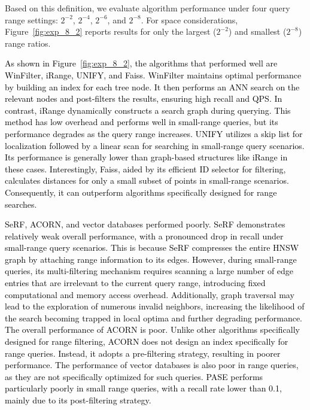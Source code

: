\documentclass[sigconf, nonacm, pdfa]{acmart}
\begin{document}
{	Based on this definition, we evaluate algorithm performance under four query range settings: $2^{-2}$, $2^{-4}$, $2^{-6}$, and $2^{-8}$. For space considerations, Figure~\ref{fig:exp_8_2} reports results for only the largest ($2^{-2}$) and smallest ($2^{-8}$) range ratios. 
	

	
	\textcolor{black}{
		As shown in Figure~\ref{fig:exp_8_2}, the algorithms that performed well are WinFilter, iRange, UNIFY, and Faiss.
	WinFilter maintains optimal performance by building an index for each tree node. It then performs an ANN search on the relevant nodes and post-filters the results, ensuring high recall and QPS.
	In contrast, iRange dynamically constructs a search graph during querying. This method has low overhead and performs well in small-range queries, but its performance degrades as the query range increases.
	UNIFY utilizes a skip list for localization followed by a linear scan for searching in small-range query scenarios. Its performance is generally lower than graph-based structures like iRange in these cases.
	Interestingly, Faiss, aided by its efficient ID selector for filtering, calculates distances for only a small subset of points in small-range scenarios. Consequently, it can outperform algorithms specifically designed for range searches.
	}

	\textcolor{black}{SeRF, ACORN, and vector databases performed poorly.
		SeRF demonstrates relatively weak overall performance, with a pronounced drop in recall under small-range query scenarios. This is because SeRF compresses the entire HNSW graph by attaching range information to its edges. However, during small-range queries, its multi-filtering mechanism requires scanning a large number of edge entries that are irrelevant to the current query range, introducing fixed computational and memory access overhead. Additionally, graph traversal may lead to the exploration of numerous invalid neighbors, increasing the likelihood of the search becoming trapped in local optima and further degrading performance.
		The overall performance of ACORN is poor. Unlike other algorithms specifically designed for range filtering, ACORN does not design an index specifically for range queries. Instead, it adopts a pre-filtering strategy, resulting in poorer performance.
		The performance of vector databases is also poor in range queries, as they are not specifically optimized for such queries. PASE performs particularly poorly in small range queries, with a recall rate lower than 0.1, mainly due to its post-filtering strategy.
	}

}
\end{document}
